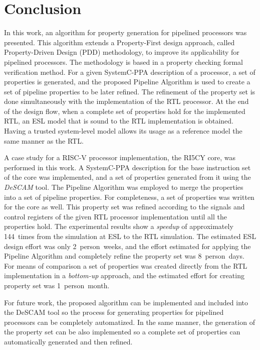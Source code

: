 \chapter{Conclusion}
\label{chapter:conclusion}

In this work, an algorithm for property generation for pipelined processors was presented. This algorithm extends a Property-First design approach, called Property-Driven Design (PDD) methodology, to improve its applicability for pipelined processors. The methodology is based in a property checking formal verification method. For a given SystemC-PPA description of a processor, a set of properties is generated, and the proposed Pipeline Algorithm is used to create a set of pipeline properties to be later refined. The refinement of the property set is done simultaneously with the implementation of the RTL processor. At the end of the design flow, when a complete set of properties hold for the implemented RTL, an ESL model that is sound to the RTL implementation is obtained. Having a trusted system-level model allows its usage as a reference model the same manner as the RTL. 

A case study for a RISC-V processor implementation, the RI5CY core, was performed in this work. A SystemC-PPA description for the base instruction set of the core was implemented, and a set of properties generated from it using the \textit{DeSCAM} tool. The Pipeline Algorithm was employed to merge the properties into a set of pipeline properties. For completeness, a set of \SSQED{} properties was written for the core as well. This property set was refined according to the signals and control registers of the given RTL processor implementation until all the properties hold. The experimental results show a \textit{speedup} of approximately 144~times from the simulation at ESL to the RTL simulation. The estimated ESL design effort was only 2~person~weeks, and the effort estimated for applying the Pipeline Algorithm and completely refine the property set was 8~person~days. For means of comparison a set of properties was created directly from the RTL implementation in a \textit{bottom-up} approach, and the estimated effort for creating property set was 1~person~month.

For future work, the proposed algorithm can be implemented and included into the DeSCAM tool so the process for generating properties for pipelined processors can be completely automatized. In the same manner, the generation of the \SSQED{} property set can be also implemented so a complete set of properties can automatically generated and then refined.